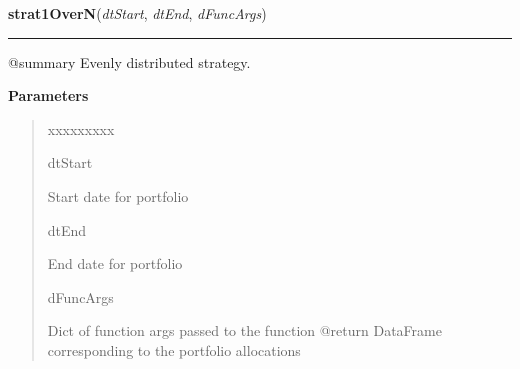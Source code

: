 \hspace{.8\funcindent}\begin{boxedminipage}{\funcwidth}

    \raggedright \textbf{strat1OverN}(\textit{dtStart}, \textit{dtEnd}, \textit{dFuncArgs})

    \vspace{-1.5ex}

    \rule{\textwidth}{0.5\fboxrule}
\setlength{\parskip}{2ex}
    @summary Evenly distributed strategy.

\setlength{\parskip}{1ex}
      \textbf{Parameters}
      \vspace{-1ex}

      \begin{quote}
        \begin{Ventry}{xxxxxxxxx}

          \item[dtStart]

          Start date for portfolio

          \item[dtEnd]

          End date for portfolio

          \item[dFuncArgs]

          Dict of function args passed to the function @return DataFrame 
          corresponding to the portfolio allocations

        \end{Ventry}

      \end{quote}

    \end{boxedminipage}

    \label{QSTK:qstkstrat:strategies:stratMark}

    \vspace{0.5ex}

